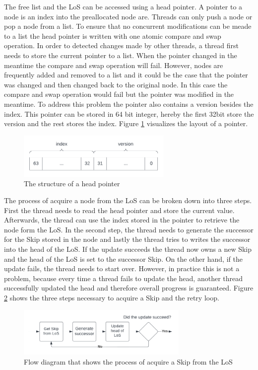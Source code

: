 \documentclass[sigconf,nonacm]{acmart}
\begin{document}
        The free list and the LoS can be accessed using a head pointer. A pointer to a node is an index into the preallocated node are. Threads can only push a node or pop a node from a list. To ensure that no concurrent modifications can be meade to a list the head pointer is written with one atomic compare and swap operation. In order to detected changes made by other threads, a thread first needs to store the current pointer to a list. When the pointer changed in the meantime the compare and swap operation will fail. However, nodes are frequently added and removed to a list and it could be the case that the pointer was changed and then changed back to the original node. In this case the compare and swap operation would fail but the pointer was modified in the meantime. To address this problem the pointer also contains a version besides the index. This pointer can be stored in 64 bit integer, hereby the first 32bit store the version and the rest stores the index. Figure \ref{fig:pointer} visualizes the layout of a pointer.
        \begin{figure}[h]
            \includegraphics[height=2.2cm]{figure4.pdf}
            \caption{The structure of a head pointer}
            \label{fig:pointer}
        \end{figure}  

        The process of acquire a node from the LoS can be broken down into three steps. First the thread needs to read the head pointer and store the current value. Afterwards, the thread can use the index stored in the pointer to retrieve the node form the LoS. In the second step, the thread needs to generate the successor for the Skip stored in the node and lastly the thread tries to writes the successor into the head of the LoS. If the update succeeds the thread now owns a new Skip and the head of the LoS is set to the successor Skip. On the other hand, if the update fails, the thread needs to start over. However, in practice this is not a problem, because every time a thread fails to update the head, another thread successfully updated the head and therefore overall progress is guaranteed. Figure \ref{fig:acquire} shows the three steps necessary to acquire a Skip and the retry loop.
        \begin{figure}[h]
            \includegraphics[height=2.4cm]{figure5.pdf}
            \caption{Flow diagram that shows the process of acquire a Skip from the LoS}
            \label{fig:acquire}
        \end{figure}
\end{document}
